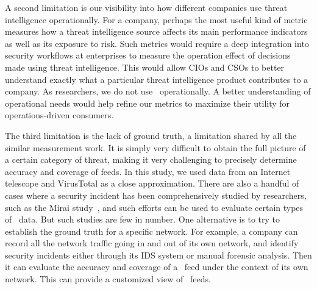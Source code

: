 
A second limitation is our visibility into how different companies use threat
intelligence operationally. For a company, perhaps the most useful kind of metric
measures how a threat intelligence source affects its main performance indicators
as well as its exposure to risk. Such metrics would require a deep integration
into security workflows at enterprises to measure the operation effect of decisions
made using threat intelligence. This would allow CIOs and CSOs to better understand
exactly what a particular threat intelligence product contributes to a company. As
researchers, we do not use \ti\ operationally. A better understanding of operational
needs would help refine our metrics to maximize their utility for operations-driven consumers.

The third limitation is the lack of ground truth, a limitation shared
by all the similar measurement work. It is simply very difficult to obtain the full picture
of a certain category of threat, making it very challenging to precisely determine accuracy and coverage of feeds. In this
study, we used data from an Internet telescope and VirusTotal as a close approximation.
There are also a handful of cases where a security incident has been comprehensively studied by
researchers, such as the Mirai study~\cite{antonakakis2017understanding}, and such efforts
can be used to evaluate certain types of \ti\ data. But such studies are few in number.
One alternative is to try to establish the ground truth for a specific network.
For example, a company can record all the network traffic going in and out of its own network,
and identify security incidents either through its IDS system or manual forensic analysis.
Then it can evaluate the accuracy and coverage of a \ti\ feed under the context of its
own network. This can provide a customized view of \ti\ feeds.




